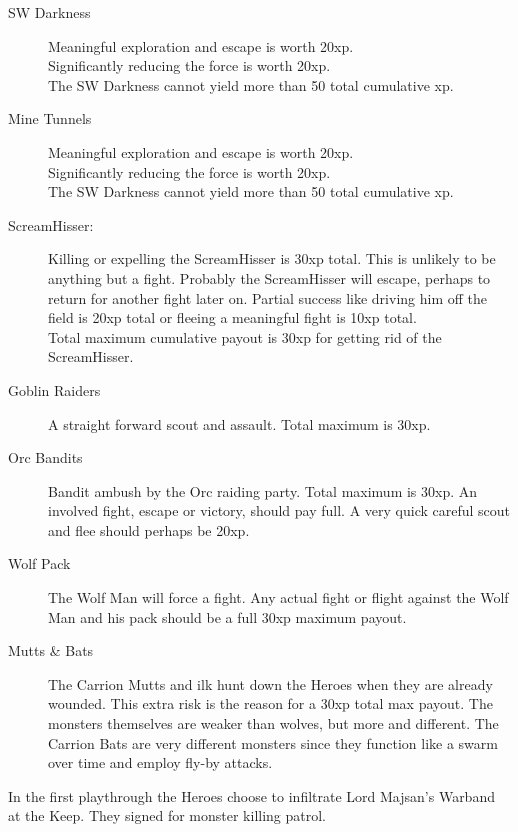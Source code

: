 \begin{description}
\item[SW Darkness] Meaningful exploration and escape is worth 20xp.\\
Significantly reducing the force is worth 20xp.\\
The SW Darkness cannot yield more than 50 total cumulative xp.

\item[Mine Tunnels] Meaningful exploration and escape is worth 20xp.\\
Significantly reducing the force is worth 20xp.\\
The SW Darkness cannot yield more than 50 total cumulative xp.

\item[ScreamHisser:] Killing or expelling the ScreamHisser is 30xp total. This is unlikely to be anything but a fight. Probably the ScreamHisser will escape, perhaps to return for another fight later on.  Partial success like driving him off the field is 20xp total or fleeing a meaningful fight is 10xp total.\\
Total maximum cumulative payout is 30xp for getting rid of the ScreamHisser.

\item[Goblin Raiders] A straight forward scout and assault.
Total maximum is 30xp.

\item[Orc Bandits] Bandit ambush by the Orc raiding party.
Total maximum is 30xp. An involved fight, escape or victory, should pay full. A very quick careful scout and flee should perhaps be 20xp.

\item[Wolf Pack] The Wolf Man will force a fight. Any actual fight or flight against the Wolf Man and his pack should be a full 30xp maximum payout.

\item[Mutts \& Bats]
The Carrion Mutts and ilk hunt down the Heroes when they are already wounded. This extra risk is the reason for a 30xp total max payout. The monsters themselves are weaker than wolves, but more and different. The Carrion Bats are very different monsters since they function like a swarm over time and employ fly-by attacks.

\end{description}

\noindent
In the first playthrough the Heroes choose to infiltrate Lord Majsan's Warband at the Keep. They signed for monster killing patrol. %

